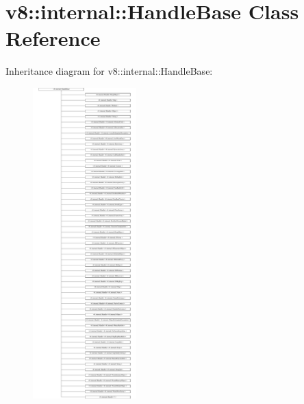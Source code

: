 \hypertarget{classv8_1_1internal_1_1HandleBase}{}\section{v8\+:\+:internal\+:\+:Handle\+Base Class Reference}
\label{classv8_1_1internal_1_1HandleBase}
Inheritance diagram for v8\+:\+:internal\+:\+:Handle\+Base\+:\begin{figure}[H]
\begin{center}
\leavevmode
\includegraphics[height=12.000000cm]{classv8_1_1internal_1_1HandleBase}
\end{center}
\end{figure}
